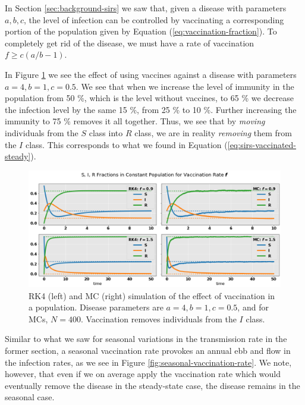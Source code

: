 \documentclass[]{article}
\begin{document}
In Section \ref{sec:background-sirs} we saw that, given a disease with parameters $a,b,c$, the level of infection can be controlled by vaccinating a corresponding portion of the population given by Equation (\ref{eq:vaccination-fraction}). To completely get rid of the disease, we must have a rate of vaccination $f \ge c(a/b - 1)$.

In Figure \ref{fig:vaccination-rates} we see the effect of using vaccines against a disease with parameters $a=4, b=1, c=0.5$. We see that when we increase the level of immunity in the population from 50 \%, which is the level without vaccines, to 65 \% we decrease the infection level by the same 15 \%, from 25 \% to 10 \%.  Further increasing the immunity to 75 \% removes it all together. Thus, we see that by \textit{moving} individuals from the $S$ class into $R$ class, we are in reality \textit{removing} them from the $I$ class. This corresponds to what we found in Equation (\ref{eq:sirs-vaccinated-steady}).

\begin{figure}[!h]
	\centering
	\includegraphics[width=1\linewidth]{./figs/vaccination-rates.png}
	\caption{RK4 (left) and MC (right) simulation of the effect of vaccination in a population. Disease parameters are $a=4, b= 1, c=0.5$, and for MCs, $N=400$. Vaccination removes individuals from the $I$ class.}
	\label{fig:vaccination-rates}
\end{figure}

Similar to what we saw for seasonal variations in the transmission rate in the former section, a seasonal vaccination rate provokes an annual ebb and flow in the infection rates, as we see in Figure \ref{fig:seasonal-vaccination-rate}. We note, however, that even if we on average apply the vaccination rate which would eventually remove the disease in the steady-state case, the disease remains in the seasonal case. 
\end{document}
